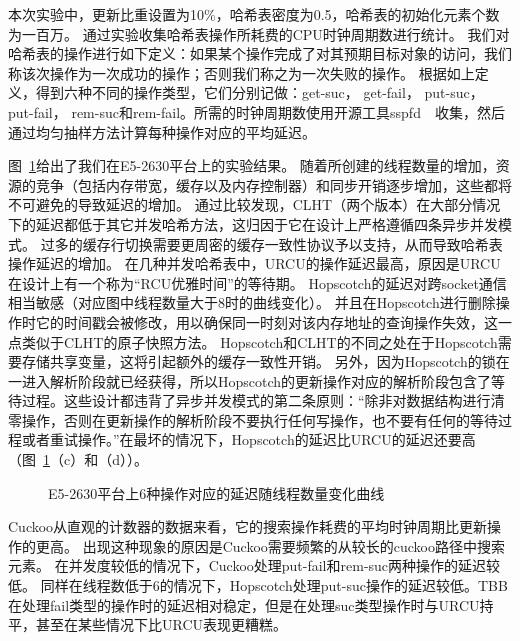 本次实验中，更新比重设置为10\%，哈希表密度为0.5，哈希表的初始化元素个数为一百万。
通过实验收集哈希表操作所耗费的CPU时钟周期数进行统计。
我们对哈希表的操作进行如下定义：如果某个操作完成了对其预期目标对象的访问，我们称该次操作为一次成功的操作；否则我们称之为一次失败的操作。
根据如上定义，得到六种不同的操作类型，它们分别记做：get-suc， get-fail， put-suc， put-fail， rem-suc和rem-fail。所需的时钟周期数使用开源工具sspfd~\cite{sspfd}~收集，然后通过均匀抽样方法计算每种操作对应的平均延迟。

图~\ref{fig:latency}给出了我们在E5-2630平台上的实验结果。
随着所创建的线程数量的增加，资源的竞争（包括内存带宽，缓存以及内存控制器）和同步开销逐步增加，这些都将不可避免的导致延迟的增加。
通过比较发现，CLHT（两个版本）在大部分情况下的延迟都低于其它并发哈希方法，这归因于它在设计上严格遵循四条异步并发模式。
过多的缓存行切换需要更周密的缓存一致性协议予以支持，从而导致哈希表操作延迟的增加。
在几种并发哈希表中，URCU的操作延迟最高，原因是URCU在设计上有一个称为“RCU优雅时间”的等待期。
Hopscotch的延迟对跨socket通信相当敏感（对应图中线程数量大于8时的曲线变化）。
并且在Hopscotch进行删除操作时它的时间戳会被修改，用以确保同一时刻对该内存地址的查询操作失效，这一点类似于CLHT的原子快照方法。
Hopscotch和CLHT的不同之处在于Hopscotch需要存储共享变量，这将引起额外的缓存一致性开销。
另外，因为Hopscotch的锁在一进入解析阶段就已经获得，所以Hopscotch的更新操作对应的解析阶段包含了等待过程。这些设计都违背了异步并发模式的第二条原则：“除非对数据结构进行清零操作，否则在更新操作的解析阶段不要执行任何写操作，也不要有任何的等待过程或者重试操作。”在最坏的情况下，Hopscotch的延迟比URCU的延迟还要高（图~\ref{fig:latency}（c）和（d））。

\begin{figure}[htbp]
\centering
\caption{E5-2630平台上6种操作对应的延迟随线程数量变化曲线}
\label{fig:latency}
\end{figure}

Cuckoo从直观的计数器的数据来看，它的搜索操作耗费的平均时钟周期比更新操作的更高。
出现这种现象的原因是Cuckoo需要频繁的从较长的cuckoo路径中搜索元素。
在并发度较低的情况下，Cuckoo处理put-fail和rem-suc两种操作的延迟较低。
同样在线程数低于6的情况下，Hopscotch处理put-suc操作的延迟较低。TBB在处理fail类型的操作时的延迟相对稳定，但是在处理suc类型操作时与URCU持平，甚至在某些情况下比URCU表现更糟糕。


